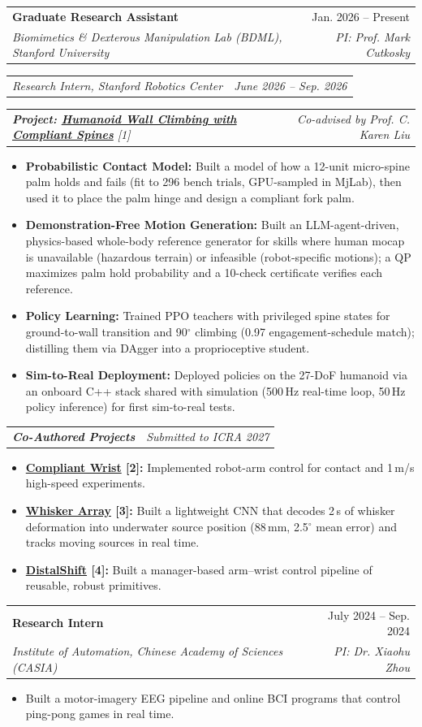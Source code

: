 \documentclass[letterpaper,11pt]{article}
\makeatletter
\newcommand{\resumeItem}[1]{
  \item\small{
    {#1 \vspace{-2pt}}
  }
}
\newcommand{\resumeSubheading}[4]{
  \vspace{-2pt}\item
    \begin{tabular*}{0.97\textwidth}[t]{l@{\extracolsep{\fill}}r}
      \textbf{#1} & #2 \\
      \textit{\small#3} & \textit{\small #4} \\
    \end{tabular*}\vspace{-7pt}
}
\newcommand{\resumeSubSubheading}[2]{
    \item
    \begin{tabular*}{0.97\textwidth}{l@{\extracolsep{\fill}}r}
      \textit{\small#1} & \textit{\small #2} \\
    \end{tabular*}\vspace{-7pt}
}
\newcommand{\resumeItemListStart}{\begin{itemize}}
\newcommand{\resumeItemListEnd}{\end{itemize}\vspace{-5pt}}
\makeatother
\begin{document}
    \resumeSubheading
      {Graduate Research Assistant}{Jan. 2026 -- Present}
      {Biomimetics \& Dexterous Manipulation Lab (BDML), Stanford University}{PI: Prof. Mark Cutkosky}
    \resumeSubSubheading
      {Research Intern, Stanford Robotics Center}{June 2026 -- Sep. 2026}
    \resumeSubSubheading
      {\textbf{Project: \href{https://humanoid-climbing.github.io/}{Humanoid Wall Climbing with Compliant Spines}} [1]}{Co-advised by Prof. C. Karen Liu}
      \resumeItemListStart
        \resumeItem{\textbf{Probabilistic Contact Model:} Built a model of how a 12-unit micro-spine palm holds and fails (fit to 296 bench trials, GPU-sampled in MjLab), then used it to place the palm hinge and design a compliant fork palm.}
        \resumeItem{\textbf{Demonstration-Free Motion Generation:} Built an LLM-agent-driven, physics-based whole-body reference generator for skills where human mocap is unavailable (hazardous terrain) or infeasible (robot-specific motions); a QP maximizes palm hold probability and a 10-check certificate verifies each reference.}
        \resumeItem{\textbf{Policy Learning:} Trained PPO teachers with privileged spine states for ground-to-wall transition and 90$^\circ$ climbing (0.97 engagement-schedule match); distilling them via DAgger into a proprioceptive student.}
        \resumeItem{\textbf{Sim-to-Real Deployment:} Deployed policies on the 27-DoF humanoid via an onboard C++ stack shared with simulation (500\,Hz real-time loop, 50\,Hz policy inference) for first sim-to-real tests.}
      \resumeItemListEnd
    \resumeSubSubheading
      {\textbf{Co-Authored Projects}}{Submitted to ICRA 2027}
      \resumeItemListStart
        \resumeItem{\textbf{\href{https://compliant-wrist.github.io/}{Compliant Wrist} [2]:} Implemented robot-arm control for contact and 1\,m/s high-speed experiments.}
        \resumeItem{\textbf{\href{https://fluorescent-whisker.github.io/}{Whisker Array} [3]:} Built a lightweight CNN that decodes 2\,s of whisker deformation into underwater source position (88\,mm, 2.5$^\circ$ mean error) and tracks moving sources in real time.}
        \resumeItem{\textbf{\href{https://ruggedizedwrist.github.io/}{DistalShift} [4]:} Built a manager-based arm--wrist control pipeline of reusable, robust primitives.}
      \resumeItemListEnd

    \resumeSubheading
      {Research Intern}{July 2024 -- Sep. 2024}
      {Institute of Automation, Chinese Academy of Sciences (CASIA)}{PI: Dr. Xiaohu Zhou}
      \resumeItemListStart
        \resumeItem{Built a motor-imagery EEG pipeline and online BCI programs that control ping-pong games in real time.}
      \resumeItemListEnd
\end{document}
